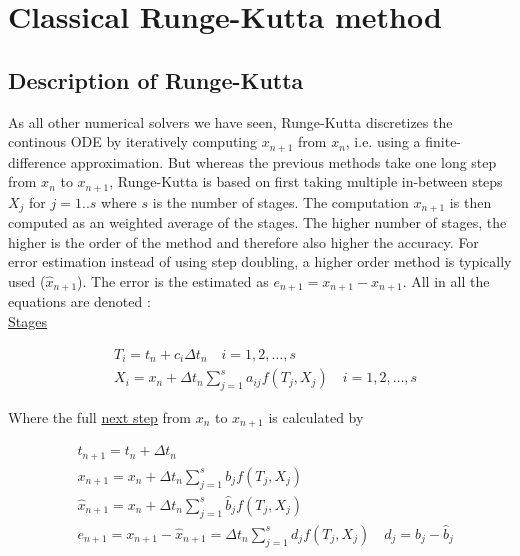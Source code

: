 \section{Classical Runge-Kutta method}

\subsection{Description of Runge-Kutta}
As all other numerical solvers we have seen, Runge-Kutta discretizes the continous ODE by iteratively computing $x_{n+1}$ from $x_n$, i.e. using a finite-difference approximation. But whereas the previous methods take one long step from $x_n$ to $x_{n+1}$, Runge-Kutta is based on first taking multiple in-between steps $X_j$ for $j=1..s$ where $s$ is the number of stages. The computation $x_{n+1}$ is then computed as an weighted average of the stages. The higher number of stages, the higher is the order of the method and therefore also higher the accuracy. For error estimation instead of using step doubling, a higher order method is typically used ($\hat{x}_{n+1}$). The error is the estimated as $e_{n+1}=x_{n+1}-\hat{x}_{n+1}$. All in all the equations are denoted \cite{JrgensenRunge-KuttaEquations}:\\
\underline{Stages}

\begin{equation}
\begin{aligned}
&T_{i}=t_{n}+c_{i} \Delta t_n \quad i=1,2, \ldots, s\\
&X_{i}=x_{n}+\Delta t_n \sum_{j=1}^{s} a_{i j} f\left(T_{j}, X_{j}\right) \quad i=1,2, \ldots, s
\end{aligned}
\end{equation}

Where the full \underline{next step} from $x_n$ to $x_{n+1}$ is calculated by

\begin{equation}
\begin{aligned}
&t_{n+1}=t_{n}+\Delta t_n \\
&x_{n+1}=x_{n}+\Delta t_n \sum_{j=1}^{s} b_{j} f\left(T_{j}, X_{j}\right) \\
&\hat{x}_{n+1}=x_{n}+\Delta t_n \sum_{j=1}^{s} \hat{b}_{j} f\left(T_{j}, X_{j}\right) \\
&e_{n+1}=x_{n+1}-\hat{x}_{n+1}=\Delta t_n \sum_{j=1}^{s} d_{j} f\left(T_{j}, X_{j}\right) \quad d_{j}=b_{j}-\hat{b}_{j}
\end{aligned}
\end{equation}

